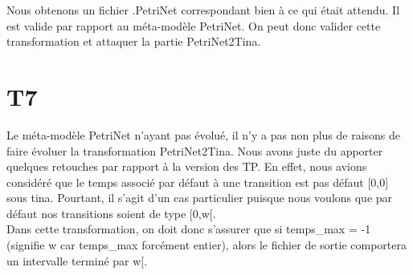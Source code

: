 \documentclass{report}
\begin{document}
Nous obtenons un fichier .PetriNet correspondant bien à ce qui était attendu. Il est valide par rapport au méta-modèle PetriNet.
On peut donc valider cette transformation et attaquer la partie PetriNet2Tina.

\section{T7}

Le méta-modèle PetriNet n'ayant pas évolué, il n'y a pas non plus de raisons de faire évoluer la transformation PetriNet2Tina. 
Nous avons juste du apporter quelques retouches par rapport à la version des TP. En effet, nous avions considéré que le temps associé par défaut à une transition est pas défaut
[0,0] sous tina. Pourtant, il s'agit d'un cas particulier puisque nous voulons que par défaut nos transitions soient de type [0,w[.\\

Dans cette transformation, on doit donc s'assurer que si temps\_max = -1 (signifie w car temps\_max forcément entier), alors le fichier de sortie comportera un intervalle terminé par w[.\\
\end{document}
